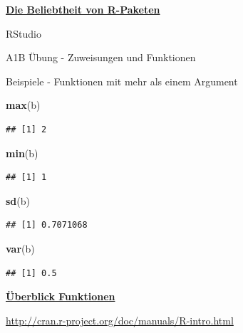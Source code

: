 \documentclass[ignorenonframetext,]{beamer}
\newenvironment{Shaded}{\begin{snugshade}}{\end{snugshade}}
\newcommand{\KeywordTok}[1]{\textcolor[rgb]{0.13,0.29,0.53}{\textbf{#1}}}
\newcommand{\NormalTok}[1]{#1}
\newcommand{\KeywordTok}[1]{\textcolor[rgb]{0.13,0.29,0.53}{\textbf{#1}}}
\newcommand{\NormalTok}[1]{#1}
\begin{document}
\begin{frame}{\href{https://gallery.shinyapps.io/cran-gauge/}{\textbf{Die
Beliebtheit von R-Paketen}}}
\begin{frame}{RStudio}
\begin{frame}[fragile]{A1B Übung - Zuweisungen und Funktionen}
\begin{frame}[fragile]{Beispiele - Funktionen mit mehr als einem
Argument}
\begin{Shaded}
\begin{Highlighting}[]
\KeywordTok{max}\NormalTok{(b)}
\end{Highlighting}
\end{Shaded}

\begin{verbatim}
## [1] 2
\end{verbatim}

\begin{Shaded}
\begin{Highlighting}[]
\KeywordTok{min}\NormalTok{(b)}
\end{Highlighting}
\end{Shaded}

\begin{verbatim}
## [1] 1
\end{verbatim}

\begin{Shaded}
\begin{Highlighting}[]
\KeywordTok{sd}\NormalTok{(b)}
\end{Highlighting}
\end{Shaded}

\begin{verbatim}
## [1] 0.7071068
\end{verbatim}

\begin{Shaded}
\begin{Highlighting}[]
\KeywordTok{var}\NormalTok{(b)}
\end{Highlighting}
\end{Shaded}

\begin{verbatim}
## [1] 0.5
\end{verbatim}

\end{frame}

\begin{frame}{\href{http://cran.r-project.org/doc/manuals/R-intro.html}{\textbf{Überblick
Funktionen}}}
\protect\hypertarget{uberblick-funktionen}{}

\url{http://cran.r-project.org/doc/manuals/R-intro.html}


\end{frame}
\end{frame}
\end{frame}
\end{frame}
\end{document}
